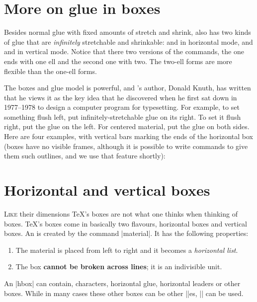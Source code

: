 \section{More on glue in boxes}

Besides normal glue with fixed amounts of stretch and shrink, \tex also has
two kinds of glue that are \emph{infinitely} stretchable and shrinkable:  and
 in horizontal mode, and  and  in vertical mode. Notice that there two versions
of the commands, the one ends with one ell and the second one with two. The
two-ell forms are more flexible than the one-ell forms.

The boxes and glue model is powerful, and \tex's author, Donald Knuth,
has written that he views it as the key idea that he discovered when he
first sat down in 1977--1978 to design a computer program for typesetting.
For example, to set something flush left, put infinitely-stretchable glue on
its right. To set it flush right, put the glue on the left. For centered material,
put the glue on both sides. Here are four examples, with vertical
bars marking the ends of the horizontal box (boxes have no visible frames,
although it is possible to write \tex commands to give them such outlines,
and we use that feature shortly):





\section{Horizontal and vertical boxes}


\noindent \lettrine{L}{ike} their dimensions \TeX's boxes are not what one thinks when thinking of boxes. TeX's boxes come in basically two flavours, horizontal boxes and vertical boxes. An  is created by the command |\hbox{material}|. It has the following properties:

\begin{enumerate}
\item The material is placed from left to right and it becomes a \textit{horizontal list}.
\item The box \textbf{cannot be broken across lines}; it is an indivisible unit.
\end{enumerate}

An |hbox| can contain, characters, horizontal glue, horizontal leaders or other boxes. While in many cases these other boxes can be other |\hbox|es, |\vbox| can be used.

